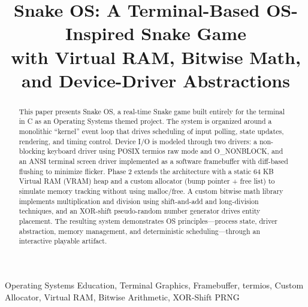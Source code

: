 \documentclass[conference]{IEEEtran}
\begin{document}
\title{
Snake OS: A Terminal-Based OS-Inspired Snake Game \\
with Virtual RAM, Bitwise Math, and Device-Driver Abstractions
}

\author{

\and
{}

\and
{}
}

\maketitle

\begin{abstract}
This paper presents Snake OS, a real-time Snake game built entirely for the terminal in C as an Operating Systems themed project. The system is organized around a monolithic ``kernel'' event loop that drives scheduling of input polling, state updates, rendering, and timing control. Device I/O is modeled through two drivers: a non-blocking keyboard driver using POSIX termios raw mode and O\_NONBLOCK, and an ANSI terminal screen driver implemented as a software framebuffer with diff-based flushing to minimize flicker. Phase 2 extends the architecture with a static 64 KB Virtual RAM (VRAM) heap and a custom allocator (bump pointer + free list) to simulate memory tracking without using malloc/free. A custom bitwise math library implements multiplication and division using shift-and-add and long-division techniques, and an XOR-shift pseudo-random number generator drives entity placement. The resulting system demonstrates OS principles---process state, driver abstraction, memory management, and deterministic scheduling---through an interactive playable artifact.
\end{abstract}

\begin{IEEEkeywords}
Operating Systems Education, Terminal Graphics, Framebuffer, termios, Custom Allocator, Virtual RAM, Bitwise Arithmetic, XOR-Shift PRNG
\end{IEEEkeywords}
\end{document}

